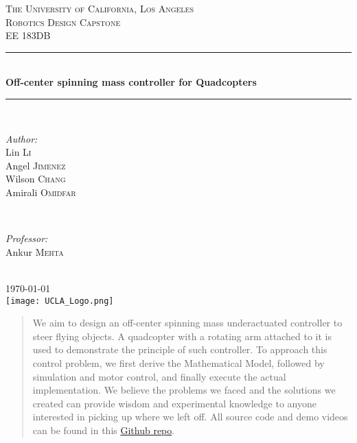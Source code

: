 \begin{titlepage}
\newcommand{\HRule}{\rule{\linewidth}{0.5mm}} %
\center %
\textsc{\LARGE The University of California, Los Angeles}\\[1.5cm] %
\textsc{\Large Robotics Design Capstone}\\[0.5cm] %
\textsc{\large EE 183DB }\\[0.5cm] %
\HRule \\[0.4cm]
{ \huge \bfseries Off-center spinning mass controller for Quadcopters}\\[0.4cm] %
\HRule \\[1.5cm]
\begin{minipage}{0.4\textwidth}
\begin{flushleft} \large
\emph{Author:}\\
Lin \textsc{Li} %
\\
Angel \textsc{Jimenez} %
\\
Wilson \textsc{Chang} %
\\
Amirali \textsc{Omidfar} %
\end{flushleft}
\end{minipage}
~
\begin{minipage}{0.4\textwidth}
\begin{flushright} \large
\emph{Professor:} \\
Ankur \textsc{Mehta} %
\end{flushright}
\end{minipage}\\[1cm]
{\large \today}\\[1cm] %
\texttt{[image: UCLA\_Logo.png]}\\[1cm] %
\vfill %
\end{titlepage}
\begin{abstract}
  We aim to design an off-center spinning mass underactuated controller to steer flying objects. A quadcopter with a rotating arm attached to it is used to demonstrate the principle of such controller. To approach this control problem, we first derive the Mathematical Model, followed by simulation and motor control, and finally execute the actual implementation. We believe the problems we faced and the solutions we created can provide wisdom and experimental knowledge to anyone interested in picking up where we left off. All source code and demo videos can be found in this \href{https://github.com/Amir-Omidfar/183DB-}{Github repo}.
\end{abstract}
\tableofcontents
\newpage
